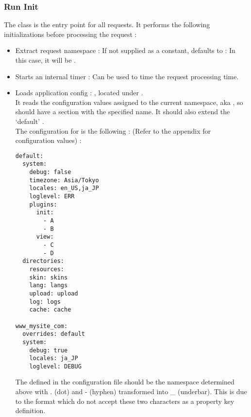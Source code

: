 \documentclass[pdftex,12pt,a4paper]{article}
\begin{document}
\subsubsection{Run Init}
The  class is the entry point for all requests. It performs the following initializations before processing the request :
\begin{itemize}
    \item Extract request namespace : If not supplied as a  constant, defaults to  : In this case, it will be .
    \item Starts an internal timer : Can be used to time the request processing time.
    \item Loads application config : , located under . \\
It reads the configuration values assigned to the current namespace, aka , so  should have a section with the specified name. It should also extend the `default' . \\
The configuration for   is the following : (Refer to the  appendix for configuration values) :

\begin{lstlisting}
default:
  system:
    debug: false
    timezone: Asia/Tokyo
    locales: en_US,ja_JP
    loglevel: ERR
    plugins:
      init:
        - A
        - B
      view:
        - C
        - D
  directories:
    resources:
    skin: skins
    lang: langs
    upload: upload
    log: logs
    cache: cache

www_mysite_com:
  overrides: default
  system:
    debug: true
    locales: ja_JP
    loglevel: DEBUG
\end{lstlisting}

\begin{note}
The  defined in the configuration file should be the namespace determined above with . (dot) and - (hyphen) transformed into \_ (underbar). This is due to the  format which do not accept these two characters as a property key definition.
\end{note}


\end{itemize}
\end{document}
